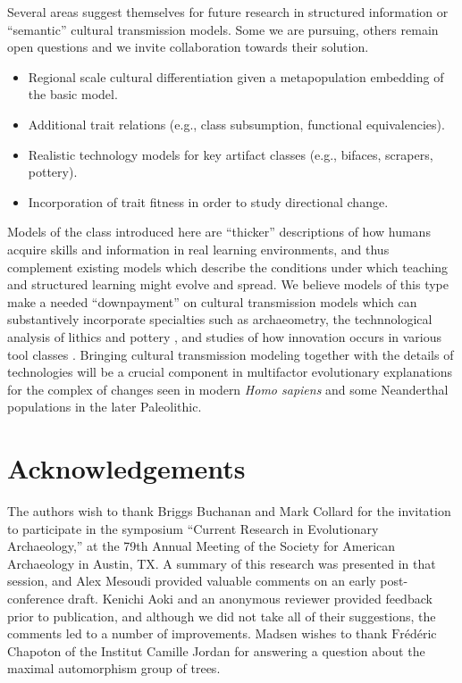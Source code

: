 Several areas suggest themselves for future research in structured
information or ``semantic'' cultural transmission models. Some we are
pursuing, others remain open questions and we invite collaboration
towards their solution.

\begin{itemize}
\itemsep1pt\parskip0pt
\item
  Regional scale cultural differentiation given a metapopulation
  embedding of the basic model.
\item
  Additional trait relations (e.g., class subsumption, functional
  equivalencies).
\item
  Realistic technology models for key artifact classes (e.g., bifaces,
  scrapers, pottery).
\item
  Incorporation of trait fitness in order to study directional change.
\end{itemize}

Models of the class introduced here are ``thicker'' descriptions of how
humans acquire skills and information in real learning environments, and
thus complement existing models which describe the conditions under
which teaching and structured learning might evolve and spread. We
believe models of this type make a needed ``downpayment'' on cultural
transmission models which can substantively incorporate specialties such
as archaeometry, the technnological analysis of lithics and pottery
\citep{tostevin2012seeing}, and studies of how innovation occurs in
various tool classes \citep[e.g.,][]{o2010innovation}. Bringing cultural
transmission modeling together with the details of technologies will be
a crucial component in multifactor evolutionary explanations for the
complex of changes seen in modern \emph{Homo sapiens} and some
Neanderthal populations in the later Paleolithic.

\section{Acknowledgements}\label{acknowledgements}

The authors wish to thank Briggs Buchanan and Mark Collard for the
invitation to participate in the symposium ``Current Research in
Evolutionary Archaeology,'' at the 79th Annual Meeting of the Society
for American Archaeology in Austin, TX. A summary of this research was
presented in that session, and Alex Mesoudi provided valuable comments
on an early post-conference draft. Kenichi Aoki and an anonymous
reviewer provided feedback prior to publication, and although we did not
take all of their suggestions, the comments led to a number of
improvements. Madsen wishes to thank $\textrm{Fr\'ed\'eric}$ Chapoton of
the Institut Camille Jordan for answering a question about the maximal
automorphism group of trees.

